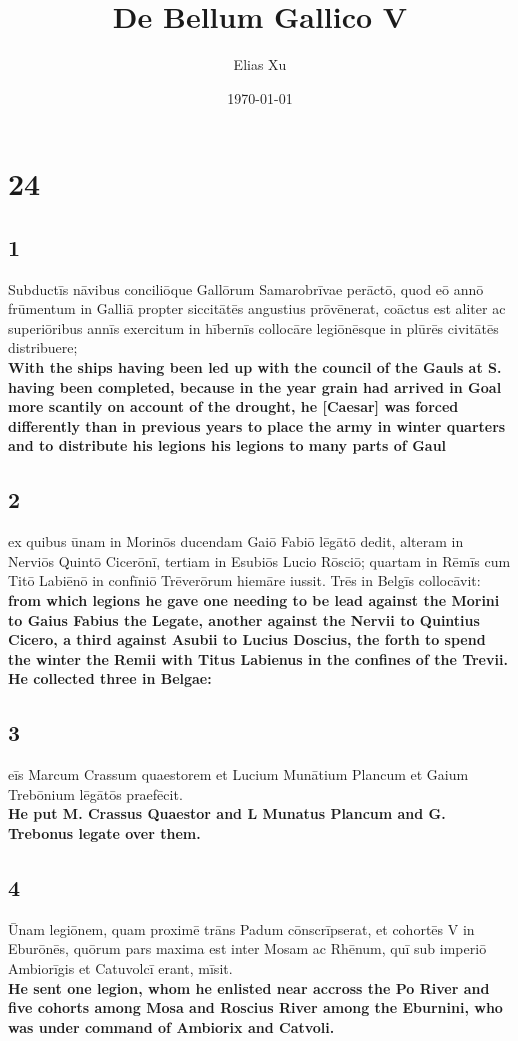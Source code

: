 \documentclass{article}
\begin{document}
\title{De Bellum Gallico V}
\author{Elias Xu}
\date{\today}
\maketitle

\setlength{\parindent}{0pt}

\section*{24}
\subsection*{1}
Subductīs nāvibus conciliōque Gallōrum Samarobrīvae perāctō, quod eō
annō frūmentum in Galliā propter siccitātēs angustius prōvēnerat, coāctus
est aliter ac superiōribus annīs exercitum in hībernīs collocāre legiōnēsque in
plūrēs civitātēs distribuere; \\
\textbf{With the ships having been led up with the council of the Gauls at S. having been completed, because in the year grain had arrived in Goal more scantily on account of the drought, he [Caesar] was forced differently than in previous years to place the army in winter quarters and to distribute his legions his legions to many parts of Gaul}

\subsection*{2}
ex quibus ūnam in Morinōs ducendam Gaiō Fabiō lēgātō dedit, alteram in Nerviōs Quintō Cicerōnī, tertiam in Esubiōs Lucio Rōsciō; quartam in Rēmīs cum Titō Labiēnō in confīniō Trēverōrum hiemāre iussit. Trēs in Belgīs collocāvit: \\
\textbf{from which legions he gave one needing to be lead against the Morini to Gaius Fabius the Legate, another against the Nervii to Quintius Cicero, a third against Asubii to Lucius Doscius, the forth to spend the winter the Remii with Titus Labienus in the confines of the Trevii. He collected three in Belgae:}

\subsection*{3}
eīs Marcum Crassum quaestorem et Lucium Munātium Plancum et Gaium Trebōnium lēgātōs praefēcit.\\
\textbf{He put M. Crassus Quaestor and L Munatus Plancum and G. Trebonus legate over them.}
\subsection*{4}
Ūnam legiōnem, quam proximē trāns Padum cōnscrīpserat, et cohortēs V in
Eburōnēs, quōrum pars maxima est inter Mosam ac Rhēnum, quī sub
imperiō Ambiorīgis et Catuvolcī erant, mīsit.\\
\textbf{He sent one legion, whom he enlisted near accross the Po River and five cohorts among Mosa and Roscius River among the Eburnini, who was under command of Ambiorix and Catvoli.}
\end{document}
